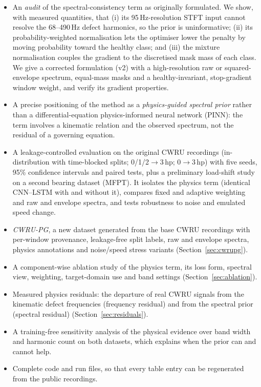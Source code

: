 \documentclass[conference]{IEEEtran}
\begin{document}
\begin{itemize}
\item An \emph{audit} of the spectral-consistency term as originally formulated.
We show, with measured quantities, that (i) its 95\,Hz-resolution STFT input
cannot resolve the 68--490\,Hz defect harmonics, so the prior is uninformative;
(ii) its probability-weighted normalisation lets the optimiser lower the
penalty by moving probability toward the healthy class; and (iii) the mixture
normalisation couples the gradient to the discretised mask mass of each class.
We give a corrected formulation (v2) with a high-resolution raw or
squared-envelope spectrum, equal-mass masks and a healthy-invariant,
stop-gradient window weight, and verify its gradient properties.
\item A precise positioning of the method as a \emph{physics-guided spectral
prior} rather than a differential-equation physics-informed neural network
(PINN): the term involves a kinematic relation and the observed spectrum, not
the residual of a governing equation.
\item A leakage-controlled evaluation on the original CWRU recordings
(in-distribution with time-blocked splits; 0/1/2$\to$3\,hp; 0$\to$3\,hp) with
five seeds, 95\% confidence intervals and paired tests, plus a preliminary
load-shift study on a second bearing dataset (MFPT). It isolates the physics term (identical CNN--LSTM with and without
it), compares fixed and adaptive weighting and raw and envelope spectra, and
tests robustness to noise and emulated speed change.
\item \emph{CWRU-PG}, a new dataset generated from the base CWRU recordings
with per-window provenance, leakage-free split labels, raw and envelope
spectra, physics annotations and noise/speed stress variants
(Section~\ref{sec:cwrupg}).
\item A component-wise ablation study of the physics term, its loss form,
spectral view, weighting, target-domain use and band settings
(Section~\ref{sec:ablation}).
\item Measured physics residuals: the departure of real CWRU signals from the
kinematic defect frequencies (frequency residual) and from the spectral prior
(spectral residual) (Section~\ref{sec:residuals}).
\item A training-free sensitivity analysis of the physical evidence over band
width and harmonic count on both datasets, which explains when the prior can
and cannot help.
\item Complete code and run files, so that every table entry can be regenerated
from the public recordings.
\end{itemize}
\end{document}
